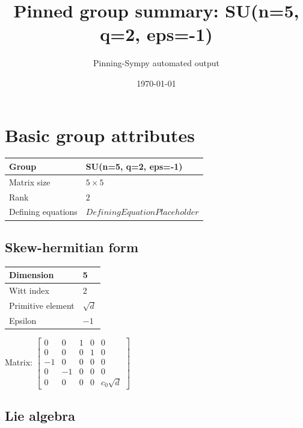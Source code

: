 \documentclass[11pt]{article}
\title{Pinned group summary: SU(n=5, q=2, eps=-1)}
\author{Pinning-Sympy automated output}
\date{\today}
\theoremstyle{definition}
\begin{document}
\maketitle
\tableofcontents

\newpage

\section{Basic group attributes}

\begin{tabular}{|l|l|}
	\hline
    Group & SU(n=5, q=2, eps=-1) \\
	\hline
    Matrix size & $5 \times 5$ \\
	\hline
    Rank & $2$ \\
	\hline
	Defining equations & $DefiningEquationPlaceholder$ \\
	\hline
\end{tabular}

\subsection{Skew-hermitian form}
\begin{tabular}{|l|l|}
    \hline
    Dimension & 5 \\
    \hline
    Witt index & 2 \\
    \hline
    Primitive element & $\sqrt{d}$ \\
    \hline
    Epsilon & $-1$ \\
    \hline
\end{tabular}

\bigskip
\noindent Matrix: \(
\left[\begin{matrix}0 & 0 & 1 & 0 & 0\\0 & 0 & 0 & 1 & 0\\-1 & 0 & 0 & 0 & 0\\0 & -1 & 0 & 0 & 0\\0 & 0 & 0 & 0 & c_{0} \sqrt{d}\end{matrix}\right]
\)



\subsection{Lie algebra}
\end{document}
